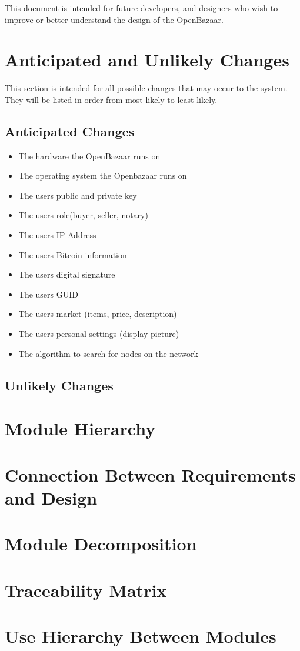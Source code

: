 \documentclass{article}
\begin{document}
This document is intended for future developers, and designers who wish to improve or better understand the design of the OpenBazaar.


\section*{Anticipated and Unlikely Changes}
This section is intended for all possible changes that may occur to the system. They will be listed in order from most likely to least likely.
\newline
\newline
\subsection{Anticipated Changes}
\begin{itemize}
\item
The hardware the OpenBazaar runs on
\item
The operating system the Openbazaar runs on
\item
The users public and private key
\item
The users role(buyer, seller, notary)
\item
The users IP Address
\item
The users Bitcoin information
\item
The users digital signature
\item
The users GUID
\item
The users market (items, price, description)
\item
The users personal settings (display picture)
\item
The algorithm to search for nodes on the network
\end{itemize}

\subsection{Unlikely Changes}


\section*{Module Hierarchy}

\section*{Connection Between Requirements and Design}

\section*{Module Decomposition}


\section*{Traceability Matrix}

\section*{Use Hierarchy Between Modules}
\end{document}
